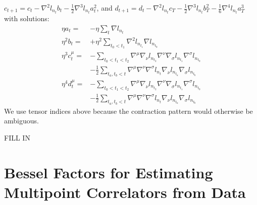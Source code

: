 \documentclass{article}
\begin{document}
            $
                c_{t+1} = c_t -\nabla^2 l_{n_t} b_t 
                              -\frac{1}{2} \nabla^3 l_{n_t} a_t^2
            $, and
            $
                d_{t+1} = d_t -             \nabla^2 l_{n_t} c_T
                              - \frac{1}{2} \nabla^3 l_{n_t} b_T^2 
                              - \frac{1}{6} \nabla^4 l_{n_t} a_T^3 
            $
            with solutions:
            \begin{align*}
                \eta a_t = &-\eta \sum_{t} \nabla l_{n_t}
                \\ 
                \eta^2 b_t = &+\eta^2 \sum_{t_0 < t_1} \nabla^2 l_{n_{t_1}} \nabla l_{n_{t_0}}
                \\
                \eta^3 c_t^\mu =
                    &-\sum_{t_0 < t_1 < t_2} 
                        \nabla^\mu \nabla_\nu l_{n_{t_2}}
                        \nabla^\nu \nabla_\sigma l_{n_{t_1}} \nabla^\sigma l_{n_{t_0}} \\
                    &-\frac{1}{2}
                        \sum_{t_a, t_b < t}
                        \nabla^\mu \nabla^\nu \nabla^\sigma l_{n_t}
                        \nabla_\nu l_{n_{t_a}}
                        \nabla_\sigma l_{n_{t_b}}
                \\
                \eta^4 d_t^\mu =
                    &-\sum_{t_0 < t_1 < t_2} 
                        \nabla^\mu \nabla_\nu l_{n_{t_2}}
                        \nabla^\nu \nabla_\sigma l_{n_{t_1}} \nabla^\sigma l_{n_{t_0}} \\
                    &-\frac{1}{2}
                        \sum_{t_a, t_b < t}
                        \nabla^\mu \nabla^\nu \nabla^\sigma l_{n_t}
                        \nabla_\nu l_{n_{t_a}}
                        \nabla_\sigma l_{n_{t_b}}
            \end{align*}
            We use tensor indices above because the contraction pattern would
            otherwise be ambiguous.

            {\color{moor} FILL IN}


\section{Bessel Factors for Estimating Multipoint Correlators from Data}\label{sect:bessel}
\end{document}
